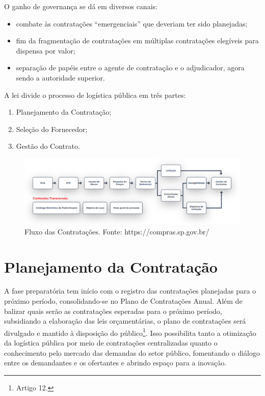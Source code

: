 O ganho de governança se dá em diversos canais:
\begin{itemize}
    \item {combate às contratações ``emergenciais'' que deveriam ter sido planejadas;}
    \item {fim da fragmentação de contratações em múltiplas contratações elegíveis para dispensa por valor;}
    \item {separação de papéis entre o agente de contratação e o adjudicador, agora sendo a autoridade superior.}
\end{itemize}

A lei divide o processo de logística pública em três partes:
\begin{enumerate}
    \item{Planejamento da Contratação;}
    \item{Seleção do Fornecedor;}
    \item{Gestão do Contrato.}
\end{enumerate}

\begin{figure}
    \centering
    \includegraphics[scale=0.26]{conteudo/imagens/fluxo.png}
    \caption{Fluxo das Contratações. Fonte: https://compras.sp.gov.br/}
    \label{fig:fluxo}
\end{figure}

\section{Planejamento da Contratação}

A fase preparatória tem início com o registro das contratações planejadas para o próximo período, consolidando-se no Plano de Contratações Anual. Além de balizar quais serão as contratações esperadas para o próximo período, subsidiando a elaboração das leis orçamentárias, o plano de contratações será divulgado e mantido à disposição do público\footnote{Artigo 12.}. Isso possibilita tanto a otimização da logística pública por meio de contratações centralizadas quanto o conhecimento pelo mercado das demandas do setor público, fomentando o diálogo entre os demandantes e os ofertantes e abrindo espaço para a inovação.

